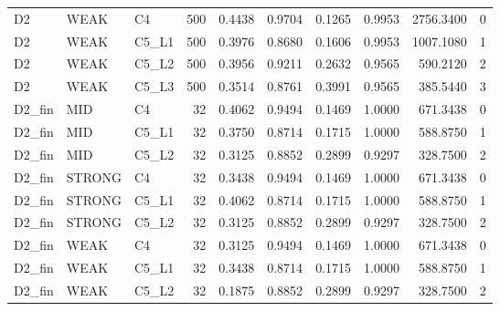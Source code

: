 \begin{tabular}{lllrrrrrrr}
D2 & WEAK & C4 & 500 & 0.4438 & 0.9704 & 0.1265 & 0.9953 & 2756.3400 & 0 \\
D2 & WEAK & C5\_L1 & 500 & 0.3976 & 0.8680 & 0.1606 & 0.9953 & 1007.1080 & 1 \\
D2 & WEAK & C5\_L2 & 500 & 0.3956 & 0.9211 & 0.2632 & 0.9565 & 590.2120 & 2 \\
D2 & WEAK & C5\_L3 & 500 & 0.3514 & 0.8761 & 0.3991 & 0.9565 & 385.5440 & 3 \\
D2\_fin & MID & C4 & 32 & 0.4062 & 0.9494 & 0.1469 & 1.0000 & 671.3438 & 0 \\
D2\_fin & MID & C5\_L1 & 32 & 0.3750 & 0.8714 & 0.1715 & 1.0000 & 588.8750 & 1 \\
D2\_fin & MID & C5\_L2 & 32 & 0.3125 & 0.8852 & 0.2899 & 0.9297 & 328.7500 & 2 \\
D2\_fin & STRONG & C4 & 32 & 0.3438 & 0.9494 & 0.1469 & 1.0000 & 671.3438 & 0 \\
D2\_fin & STRONG & C5\_L1 & 32 & 0.4062 & 0.8714 & 0.1715 & 1.0000 & 588.8750 & 1 \\
D2\_fin & STRONG & C5\_L2 & 32 & 0.3125 & 0.8852 & 0.2899 & 0.9297 & 328.7500 & 2 \\
D2\_fin & WEAK & C4 & 32 & 0.3125 & 0.9494 & 0.1469 & 1.0000 & 671.3438 & 0 \\
D2\_fin & WEAK & C5\_L1 & 32 & 0.3438 & 0.8714 & 0.1715 & 1.0000 & 588.8750 & 1 \\
D2\_fin & WEAK & C5\_L2 & 32 & 0.1875 & 0.8852 & 0.2899 & 0.9297 & 328.7500 & 2 \\
\bottomrule
\end{tabular}
